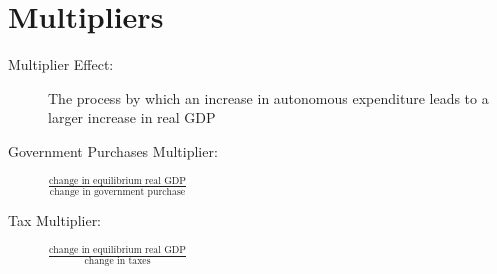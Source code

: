 \documentclass{article}
\begin{document}
\section{Multipliers}
\label{sec:multipliers}

\begin{description}
\item [Multiplier Effect:] The process by which an increase in autonomous expenditure leads to a larger increase in real GDP
\item [Government Purchases Multiplier:] $\frac{\mbox{change in equilibrium real GDP}}{\mbox{change in government purchase}}$
\item [Tax Multiplier:] $\frac{\mbox{change in equilibrium real GDP}}{\mbox{change in taxes}}$
\end{description}
\end{document}
